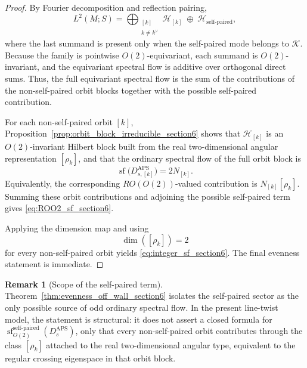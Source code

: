 \documentclass[11pt]{article}
\theoremstyle{definition}
\newtheorem{remark}[remark]{Remark}
\DeclareMathOperator{\APS}{APS}
\numberwithin{equation}{section}
\begin{document}
\begin{proof}
By Fourier decomposition and reflection pairing,
\begin{equation}\label{eq:orbit_decomposition_section6}
L^2(M;S)
=
\bigoplus_{\substack{[k]\\ k\neq k^\vee}}\mathcal H_{[k]}
\;\oplus\;
\mathcal H_{\text{self-paired}},
\end{equation}
where the last summand is present only when the self-paired mode belongs to \(\mathcal K\).
Because the family is pointwise \(O(2)\)-equivariant, each summand is \(O(2)\)-invariant, and the equivariant spectral flow is additive over orthogonal direct sums. Thus, the full equivariant spectral flow is the sum of the contributions of the non-self-paired orbit blocks together with the possible self-paired contribution.

For each non-self-paired orbit \([k]\), Proposition~\ref{prop:orbit_block_irreducible_section6}
shows that \(\mathcal H_{[k]}\) is an \(O(2)\)-invariant Hilbert block built from the
real two-dimensional angular representation \([\rho_{k}]\), and that the ordinary spectral flow of the
full orbit block is
\begin{equation}
\operatorname{sf}\!\bigl(D_{s,[k]}^{\APS}\bigr)=2N_{[k]}.
\end{equation}
Equivalently, the corresponding \(RO(O(2))\)-valued contribution is \(N_{[k]}[\rho_{k}]\). Summing these orbit contributions and adjoining the possible self-paired term gives \eqref{eq:ROO2_sf_section6}.

Applying the dimension map and using
\begin{equation}\label{eq:dimension_of_orbit_type_section6}
\dim([\rho_{k}])=2
\end{equation}
for every non-self-paired orbit yields
\eqref{eq:integer_sf_section6}. The final evenness statement is immediate.
\end{proof}



\begin{remark}[Scope of the self-paired term]
\label{rem:wall_term_scope_section6}
Theorem~\ref{thm:evenness_off_wall_section6} isolates the self-paired sector as the
only possible source of odd ordinary spectral flow. In the present line-twist model, the
statement is structural: it does not assert a closed formula for
\(\operatorname{sf}_{O(2)}^{\text{self-paired}}(D_s^{\APS})\), only that every non-self-paired orbit contributes through the class \([\rho_{k}]\) attached to the real two-dimensional
angular type, equivalent to the regular crossing eigenspace in that orbit block.
\end{remark}
\end{document}
